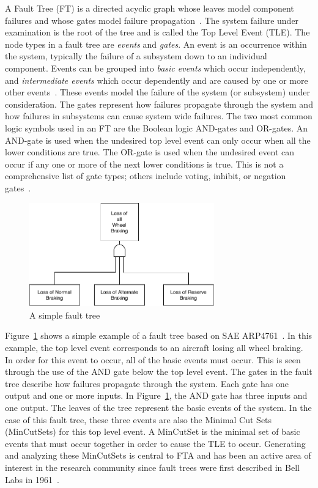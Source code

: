 A Fault Tree (FT) is a directed acyclic graph whose leaves model component failures and whose gates model failure propagation~\cite{0f356f05e72f43018211b36f97c8854a}. The system failure under examination is the root of the tree and is called the Top Level Event (TLE). The node types in a fault tree are \textit{events} and \textit{gates}. An event is an occurrence within the system, typically the failure of a subsystem down to an individual component. Events can be grouped into \textit{basic events} which occur independently, and \textit{intermediate events} which occur dependently and are caused by one or more other events~\cite{historyFTA}.  These events model the failure of the system (or subsystem) under consideration. The gates represent how failures propagate through the system and how failures in subsystems can cause system wide failures. The two most common logic symbols used in an FT are the Boolean logic AND-gates and OR-gates. An AND-gate is used when the undesired top level event can only occur when all the lower conditions are true. The OR-gate is used when the undesired event can occur if any one or more of the next lower conditions is true. This is not a comprehensive list of gate types; others include voting, inhibit, or negation gates~\cite{0f356f05e72f43018211b36f97c8854a}.
\begin{figure}[h]
\begin{center}
\includegraphics[width=8cm]{images/introFT2.pdf}
\caption{A simple fault tree} \label{fig:introFT}
\end{center}
\end{figure}

Figure~\ref{fig:introFT} shows a simple example of a fault tree based on SAE ARP4761~\cite{SAE:ARP4761}. In this example, the top level event corresponds to an aircraft losing all wheel braking. In order for this event to occur, all of the basic events must occur. This is seen through the use of the AND gate below the top level event. The gates in the fault tree describe how failures propagate through the system. Each gate has one output and one or more inputs. In Figure~\ref{fig:introFT}, the AND gate has three inputs and one output. The leaves of the tree represent the basic events of the system. %
In the case of this fault tree, these three events are also the Minimal Cut Sets (MinCutSets) for this top level event. A MinCutSet is the minimal set of basic events that must occur together in order to cause the TLE to occur. Generating and analyzing these MinCutSets is central to FTA and has been an active area of interest in the research community since fault trees were first described in Bell Labs in 1961~\cite{historyFTA,0f356f05e72f43018211b36f97c8854a}. 

